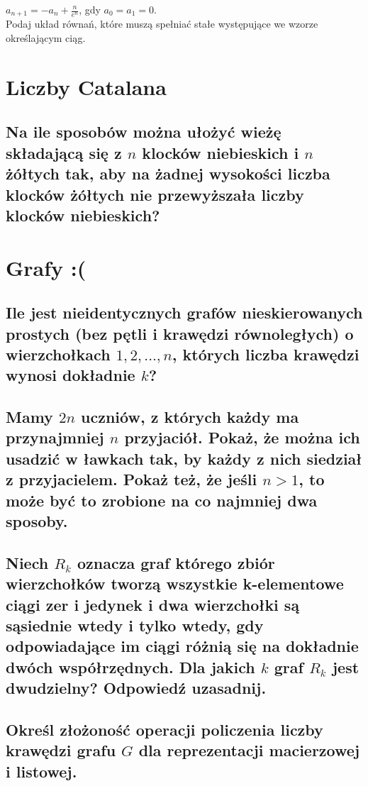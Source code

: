 \documentclass[12pt]{article}
\begin{document}
$a_{n+1}=-a_n+\frac{n}{e^n}$, gdy $a_0=a_1=0$. \\

Podaj układ równań, które muszą spełniać stałe występujące we wzorze określającym ciąg.

\section{Liczby Catalana}

\subsection{Na ile sposobów można ułożyć wieżę składającą się z $n$ klocków niebieskich i $n$ żółtych tak, aby na żadnej wysokości liczba klocków żółtych nie przewyższała liczby klocków niebieskich?}

\section{Grafy :(}

\subsection{Ile jest nieidentycznych grafów nieskierowanych prostych (bez pętli i krawędzi równoległych) o wierzchołkach $1,2,...,n$, których liczba krawędzi wynosi dokładnie $k$?}

\subsection{Mamy $2n$ uczniów, z których każdy ma przynajmniej $n$ przyjaciół. Pokaż, że można ich usadzić w ławkach tak, by każdy z nich siedział z przyjacielem. Pokaż też, że jeśli $n > 1$, to może być to zrobione na co najmniej dwa sposoby.}

\subsection{Niech $R_k$ oznacza graf którego zbiór wierzchołków tworzą wszystkie k-elementowe ciągi zer i jedynek i dwa wierzchołki są sąsiednie wtedy i tylko wtedy, gdy odpowiadające im ciągi różnią się na dokładnie dwóch współrzędnych. Dla jakich $k$ graf $R_k$ jest dwudzielny? Odpowiedź uzasadnij.}

\subsection{Określ złożoność operacji policzenia liczby krawędzi grafu $G$ dla reprezentacji macierzowej i listowej.}
\end{document}
